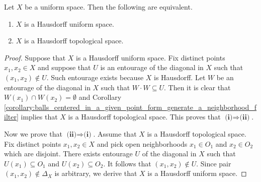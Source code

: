 \documentclass[10pt]{amsart}
\begin{document}
\begin{fact}\label{fact:Hausdorff_uniform_space_is_Hausdorff_as_a_topological_space}
	Let $X$ be a uniform space. Then the following are equivalent.
	\begin{enumerate}[label=\emph{\textbf{(\roman*)}}, leftmargin=3.0em]
		\item $X$ is a Hausdorff uniform space.
		\item $X$ is a Hausdorff topological space.
	\end{enumerate}
\end{fact}
\begin{proof}
	Suppose that $X$ is a Hausdorff uniform space. Fix distinct points $x_1,x_2 \in X$ and suppose that $U$ is an entourage of the diagonal in $X$ such that $(x_1,x_2) \not \in U$. Such entourage exists because $X$ is Hausdorff. Let $W$ be an entourage of the diagonal in $X$ such that $W\cdot W \subseteq U$. Then it is clear that $W(x_1)\cap W(x_2) = \emptyset$ and Corollary \ref{corollary:balls_centered_in_a_given_point_form_generate_a_neighborhood_filter} implies that $X$ is a Hausdorff topological space. This proves that $\textbf{(i)}\Rightarrow \textbf{(ii)}$.

	Now we prove that $\textbf{(ii)}\Rightarrow \textbf{(i)}$. Assume that $X$ is a Hausdorff topological space. Fix distinct points $x_1,x_2 \in X$ and pick open neighborhoods $x_1 \in O_1$ and $x_2 \in O_2$ which are disjoint. There exists entourage $U$ of the diagonal in $X$ such that $U(x_1) \subseteq O_1$ and $U(x_2) \subseteq O_2$. It follows that $(x_1,x_2) \not \in U$. Since pair $(x_1,x_2) \not \in \Delta_X$ is arbitrary, we derive that $X$ is a Hausdorff uniform space.
\end{proof}
\end{document}
